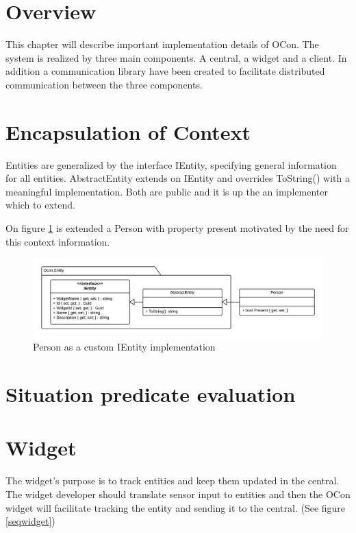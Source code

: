 \documentclass[../report.tex]{subfiles}
\begin{document}
\graphicspath{{img/}{../img/}}

\section{Overview}
This chapter will describe important implementation details of OCon. The system is realized by three main components. A central, a widget and a client. In addition a communication library have been created to facilitate distributed communication between the three components.


\section{Encapsulation of Context}

Entities are generalized by the interface IEntity, specifying general information for all entities. AbstractEntity extends on IEntity and overrides ToString() with a meaningful implementation. Both are public and it is up the an implementer which to extend.

On figure \ref{fig:PersonImplementation} is extended a Person with property present motivated by the need for this context information.


\begin{figure}[H]
\includegraphics[width=\linewidth]{customEntityClass.png}
\caption{Person as a custom IEntity implementation}
\label{fig:PersonImplementation}
\end{figure}



\section{Situation predicate evaluation}

\section{Widget}

The widget's purpose is to track entities and keep them updated in the central. The widget developer should translate sensor input to entities and then the OCon widget will facilitate tracking the entity and sending it to the central. (See figure \ref{seqwidget})
\end{document}
